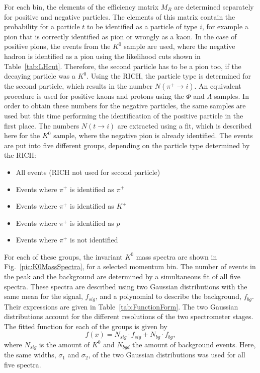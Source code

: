 For each bin, the elements of the efficiency matrix $M_R$ are determined separately for positive and negative particles. The elements of this matrix contain the probability for a particle $t$ to be identified as a particle of type $i$, for example a pion that is correctly identified as pion or wrongly as a kaon. In the case of positive pions, the events from the $K^0$ sample are used, where the negative hadron is identified as a pion using the likelihood cuts shown in Table~\ref{tab:LHcut}.  Therefore, the second particle has to be a pion too, if the decaying particle was a $K^0$. Using the RICH, the particle type is determined for the second particle, which  results in the number $N(\pi^+ \rightarrow i)$. An equivalent procedure is used for positive kaons and protons using the $\Phi$ and $\Lambda$ samples. In order to obtain these numbers for the negative particles, the same samples are used but this time performing the identification of the positive particle in the first place. The numbers $N(t \rightarrow i)$ are extracted using a fit, which is described here for the $K^0$ sample, where the negative pion is already identified. The events are put into five different groups, depending on the particle type determined by the RICH:

\begin{itemize}
  \item All events (RICH not used for second particle)
  \item Events where $\pi^+$ is identified as $\pi^+$
  \item Events where $\pi^+$ is identified as $K^+$
  \item Events where $\pi^+$ is identified as $p$
  \item Events where $\pi^+$ is not identified
\end{itemize}

For each of these groups, the invariant $K^0$ mass spectra are shown in Fig.~\ref{pic:K0MassSpectra}, for a selected momentum bin. The number of events in the peak and the background are determined by a simultaneous fit of all five spectra. These spectra are described using two Gaussian distributions with the same mean for the signal, $f_{sig}$, and a polynomial to describe the background, $f_{bg}$. Their expressions are given in Table~\ref{tab:FunctionForm}. The two Gaussian distributions account for the different resolutions of the two spectrometer stages. The fitted function for each of the groups is given by
%
\begin{equation}
  f(x) = N_{sig} \cdot f_{sig} + N_{bg} \cdot f_{bg},
\end{equation}
%
where $N_{sig}$ is the amount of $K^0$ and $N_{bgd}$ the amount of background events. Here, the same widths, $\sigma_1$ and $\sigma_2$, of the two Gaussian distributions was used for all five spectra.

